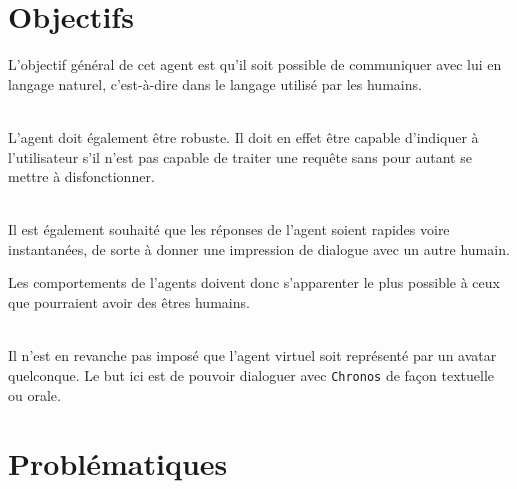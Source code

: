 






\section{Objectifs}
L'objectif général de cet agent est qu'il soit possible de communiquer avec lui en langage naturel, c'est-à-dire dans le langage utilisé par les humains. 

~\\\indent
L'agent doit également être robuste. Il doit en effet être capable d'indiquer à l'utilisateur s'il n'est pas capable de traiter une requête sans pour autant se mettre à disfonctionner.

~\\\indent 
Il est également souhaité que les réponses de l'agent soient rapides voire instantanées, de sorte à donner une impression de dialogue avec un autre humain. 

Les comportements de l'agents doivent donc s'apparenter le plus possible à ceux que pourraient avoir des êtres humains.

~\\\indent
Il n'est en revanche pas imposé que l'agent virtuel soit représenté par un avatar quelconque. Le but ici est de pouvoir dialoguer avec \texttt{Chronos} de façon textuelle ou orale.



\section{Problématiques}

